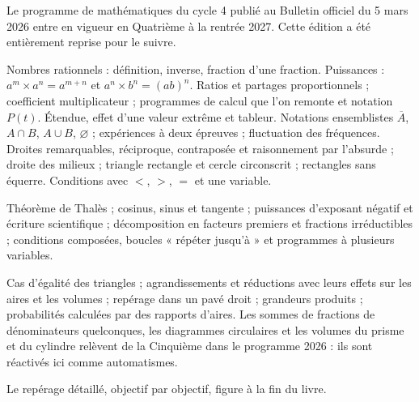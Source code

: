 \clearpage\thispagestyle{otFront}\label{nouveautes}\fontsize{11}{15}\selectfont

Le programme de mathématiques du cycle 4 publié au Bulletin officiel du 5 mars
2026 entre en vigueur en Quatrième à la rentrée 2027. Cette édition a été
entièrement reprise pour le suivre.\par\medskip
\begin{savoirfaire}Nombres rationnels : définition, inverse, fraction d’une fraction. Puissances : $a^m\times a^n=a^{m+n}$ et $a^n\times b^n=(ab)^n$. Ratios et partages proportionnels ; coefficient multiplicateur ; programmes de calcul que l’on remonte et notation $P(t)$. Étendue, effet d’une valeur extrême et tableur. Notations ensemblistes $\overline A$, $A\cap B$, $A\cup B$, $\varnothing$ ; expériences à deux épreuves ; fluctuation des fréquences. Droites remarquables, réciproque, contraposée et raisonnement par l’absurde ; droite des milieux ; triangle rectangle et cercle circonscrit ; rectangles sans équerre. Conditions avec $<$, $>$, $=$ et une variable.\end{savoirfaire}
\begin{attention}Théorème de Thalès ; cosinus, sinus et tangente ; puissances d’exposant négatif et écriture scientifique ; décomposition en facteurs premiers et fractions irréductibles ; conditions composées, boucles « répéter jusqu’à » et programmes à plusieurs variables.\end{attention}
\begin{exemple}Cas d’égalité des triangles ; agrandissements et réductions avec leurs effets sur les aires et les volumes ; repérage dans un pavé droit ; grandeurs produits ; probabilités calculées par des rapports d’aires. Les sommes de fractions de dénominateurs quelconques, les diagrammes circulaires et les volumes du prisme et du cylindre relèvent de la Cinquième dans le programme 2026 : ils sont réactivés ici comme automatismes.\end{exemple}
Le repérage détaillé, objectif par objectif, figure à la fin du livre.

\clearpage

